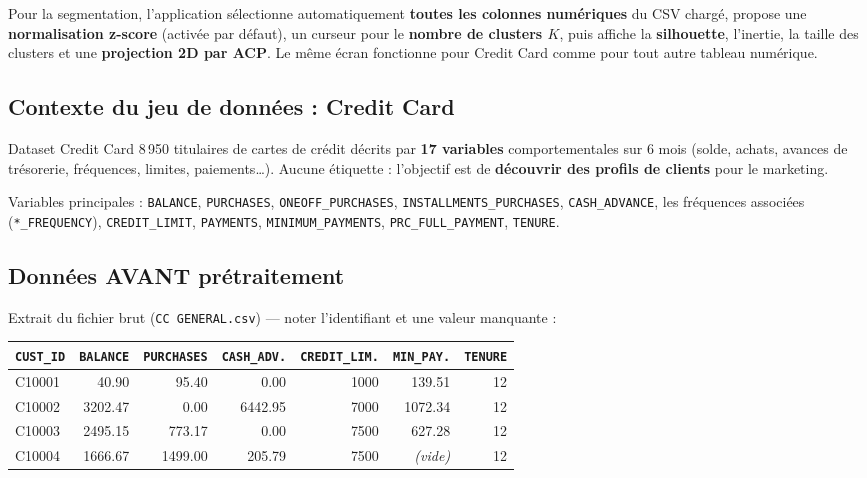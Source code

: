 \documentclass[11pt,a4paper]{article}
\begin{document}
\begin{appbox}
Pour la segmentation, l'application sélectionne automatiquement
\textbf{toutes les colonnes numériques} du CSV chargé, propose une
\textbf{normalisation z-score} (activée par défaut), un curseur pour le
\textbf{nombre de clusters $K$}, puis affiche la \textbf{silhouette}, l'inertie,
la taille des clusters et une \textbf{projection 2D par ACP}. Le même écran
fonctionne pour Credit Card comme pour tout autre tableau numérique.
\end{appbox}

\subsection{Contexte du jeu de données : Credit Card}

\begin{definition}{Dataset Credit Card}
8\,950 titulaires de cartes de crédit décrits par \textbf{17 variables}
comportementales sur 6 mois (solde, achats, avances de trésorerie, fréquences,
limites, paiements\ldots). Aucune étiquette : l'objectif est de \textbf{découvrir
des profils de clients} pour le marketing.
\end{definition}

\noindent Variables principales : \texttt{BALANCE}, \texttt{PURCHASES},
\texttt{ONEOFF\_PURCHASES}, \texttt{INSTALLMENTS\_PURCHASES},
\texttt{CASH\_ADVANCE}, les fréquences associées (\texttt{*\_FREQUENCY}),
\texttt{CREDIT\_LIMIT}, \texttt{PAYMENTS}, \texttt{MINIMUM\_PAYMENTS},
\texttt{PRC\_FULL\_PAYMENT}, \texttt{TENURE}.

\subsection{Données AVANT prétraitement}

Extrait du fichier brut (\texttt{CC GENERAL.csv}) --- noter l'identifiant et une
valeur manquante :

\begin{center}\footnotesize
\begin{tabular}{@{}lrrrrrr@{}}
\toprule
\texttt{CUST\_ID} & \texttt{BALANCE} & \texttt{PURCHASES} & \texttt{CASH\_ADV.} & \texttt{CREDIT\_LIM.} & \texttt{MIN\_PAY.} & \texttt{TENURE} \\
\midrule
C10001 & 40.90 & 95.40 & 0.00 & 1000 & 139.51 & 12 \\
C10002 & 3202.47 & 0.00 & 6442.95 & 7000 & 1072.34 & 12 \\
C10003 & 2495.15 & 773.17 & 0.00 & 7500 & 627.28 & 12 \\
C10004 & 1666.67 & 1499.00 & 205.79 & 7500 & \cellcolor{red!12}\textit{(vide)} & 12 \\
\bottomrule
\end{tabular}
\end{center}
\end{document}
